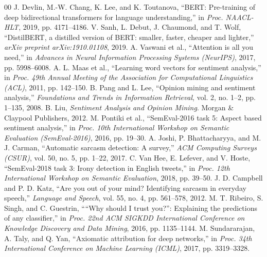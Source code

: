 \documentclass[conference]{IEEEtran}
\begin{document}
\begin{thebibliography}{00}
 J. Devlin, M.-W. Chang, K. Lee, and K. Toutanova, ``BERT: Pre-training of deep bidirectional transformers for language understanding,'' in \textit{Proc. NAACL-HLT}, 2019, pp. 4171--4186.
 V. Sanh, L. Debut, J. Chaumond, and T. Wolf, ``DistilBERT, a distilled version of BERT: smaller, faster, cheaper and lighter,'' \textit{arXiv preprint arXiv:1910.01108}, 2019.
 A. Vaswani et al., ``Attention is all you need,'' in \textit{Advances in Neural Information Processing Systems (NeurIPS)}, 2017, pp. 5998--6008.
 A. L. Maas et al., ``Learning word vectors for sentiment analysis,'' in \textit{Proc. 49th Annual Meeting of the Association for Computational Linguistics (ACL)}, 2011, pp. 142--150.
 B. Pang and L. Lee, ``Opinion mining and sentiment analysis,'' \textit{Foundations and Trends in Information Retrieval}, vol. 2, no. 1--2, pp. 1--135, 2008.
 B. Liu, \textit{Sentiment Analysis and Opinion Mining}. Morgan \& Claypool Publishers, 2012.
 M. Pontiki et al., ``SemEval-2016 task 5: Aspect based sentiment analysis,'' in \textit{Proc. 10th International Workshop on Semantic Evaluation (SemEval-2016)}, 2016, pp. 19--30.
 A. Joshi, P. Bhattacharyya, and M. J. Carman, ``Automatic sarcasm detection: A survey,'' \textit{ACM Computing Surveys (CSUR)}, vol. 50, no. 5, pp. 1--22, 2017.
 C. Van Hee, E. Lefever, and V. Hoste, ``SemEval-2018 task 3: Irony detection in English tweets,'' in \textit{Proc. 12th International Workshop on Semantic Evaluation}, 2018, pp. 39--50.
 J. D. Campbell and P. D. Katz, ``Are you out of your mind? Identifying sarcasm in everyday speech,'' \textit{Language and Speech}, vol. 55, no. 4, pp. 561--578, 2012.
 M. T. Ribeiro, S. Singh, and C. Guestrin, ````Why should I trust you?'': Explaining the predictions of any classifier,'' in \textit{Proc. 22nd ACM SIGKDD International Conference on Knowledge Discovery and Data Mining}, 2016, pp. 1135--1144.
 M. Sundararajan, A. Taly, and Q. Yan, ``Axiomatic attribution for deep networks,'' in \textit{Proc. 34th International Conference on Machine Learning (ICML)}, 2017, pp. 3319--3328.
\end{thebibliography}
\end{document}
